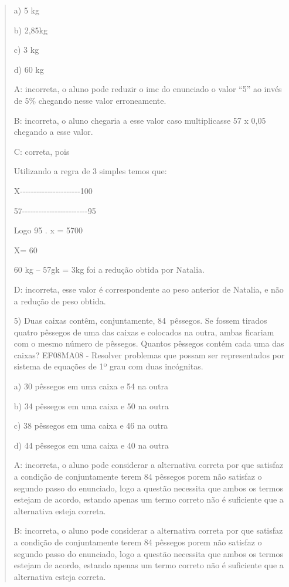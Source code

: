 \begin{quote}
\begin{escolha}
a) 5 kg

b) 2,85kg

c) 3 kg

d) 60 kg

A: incorreta, o aluno pode reduzir o imc do enunciado o valor ``5'' ao
invés de 5\% chegando nesse valor erroneamente.

B: incorreta, o aluno chegaria a esse valor caso multiplicasse 57 x 0,05
chegando a esse valor.

C: correta, pois

Utilizando a regra de 3 simples temos que:

X-\/-\/-\/-\/-\/-\/-\/-\/-\/-\/-\/-\/-\/-\/-\/-\/-\/-\/-\/-\/-\/-100

57-\/-\/-\/-\/-\/-\/-\/-\/-\/-\/-\/-\/-\/-\/-\/-\/-\/-\/-\/-\/-\/-\/-\/-95

Logo 95 . x = 5700

X= 60

60 kg -- 57gk = 3kg foi a redução obtida por Natalia.

D: incorreta, esse valor é correspondente ao peso anterior de Natalia, e
não a redução de peso obtida.

5) Duas caixas contêm, conjuntamente, 84~pêssegos. Se fossem tirados
quatro pêssegos de uma das caixas e colocados na outra, ambas ficariam
com o mesmo número de pêssegos. Quantos pêssegos contém cada uma das
caixas? EF08MA08 - Resolver problemas que possam ser representados por
sistema de equações de 1º grau com duas incógnitas.

a) 30 pêssegos em uma caixa e 54 na outra

b) 34 pêssegos em uma caixa e 50 na outra

c) 38 pêssegos em uma caixa e 46 na outra

d) 44 pêssegos em uma caixa e 40 na outra

A: incorreta, o aluno pode considerar a alternativa correta por que
satisfaz a condição de conjuntamente terem 84 pêssegos porem não
satisfaz o segundo passo do enunciado, logo a questão necessita que
ambos os termos estejam de acordo, estando apenas um termo correto não é
suficiente que a alternativa esteja correta.

B: incorreta, o aluno pode considerar a alternativa correta por que
satisfaz a condição de conjuntamente terem 84 pêssegos porem não
satisfaz o segundo passo do enunciado, logo a questão necessita que
ambos os termos estejam de acordo, estando apenas um termo correto não é
suficiente que a alternativa esteja correta.


\end{escolha}
\end{quote}
